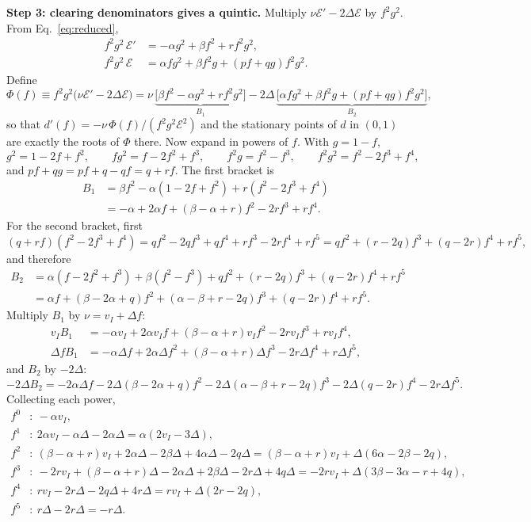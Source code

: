 \documentclass[11pt]{article}
\newcommand{\energy}{\mathcal E}
\begin{document}
\textbf{Step 3: clearing denominators gives a quintic.} Multiply $\nu\energy'-2\Delta\energy$ by $f^2g^2$. From Eq.~\eqref{eq:reduced},
\begin{align*}
 f^2g^2\,\energy'&=-\alpha g^2+\beta f^2+rf^2g^2,\\
 f^2g^2\,\energy&=\alpha fg^2+\beta f^2g+(pf+qg)f^2g^2 .
\end{align*}
Define
\begin{equation}
 \Phi(f)\equiv f^2g^2\bigl(\nu\energy'-2\Delta\energy\bigr)
 =\nu\,\underbrace{\bigl[\beta f^2-\alpha g^2+rf^2g^2\bigr]}_{B_1}
 -2\Delta\,\underbrace{\bigl[\alpha fg^2+\beta f^2g+(pf+qg)f^2g^2\bigr]}_{B_2},
 \label{eq:phi}
\end{equation}
so that $d'(f)=-\nu\,\Phi(f)/(f^2g^2\energy^2)$ and the stationary points of $d$ in $(0,1)$ are exactly the roots of $\Phi$ there. Now expand in powers of $f$. With $g=1-f$,
\[
 g^2=1-2f+f^2,\qquad fg^2=f-2f^2+f^3,\qquad f^2g=f^2-f^3,\qquad f^2g^2=f^2-2f^3+f^4,
\]
and $pf+qg=pf+q-qf=q+rf$. The first bracket is
\begin{align*}
 B_1&=\beta f^2-\alpha(1-2f+f^2)+r(f^2-2f^3+f^4)\\
    &=-\alpha+2\alpha f+(\beta-\alpha+r)f^2-2rf^3+rf^4 .
\end{align*}
For the second bracket, first
\[
 (q+rf)(f^2-2f^3+f^4)=qf^2-2qf^3+qf^4+rf^3-2rf^4+rf^5
 =qf^2+(r-2q)f^3+(q-2r)f^4+rf^5,
\]
and therefore
\begin{align*}
 B_2&=\alpha(f-2f^2+f^3)+\beta(f^2-f^3)+qf^2+(r-2q)f^3+(q-2r)f^4+rf^5\\
    &=\alpha f+(\beta-2\alpha+q)f^2+(\alpha-\beta+r-2q)f^3+(q-2r)f^4+rf^5 .
\end{align*}
Multiply $B_1$ by $\nu=v_I+\Delta f$:
\begin{align*}
 v_IB_1&=-\alpha v_I+2\alpha v_If+(\beta-\alpha+r)v_If^2-2rv_If^3+rv_If^4,\\
 \Delta fB_1&=-\alpha\Delta f+2\alpha\Delta f^2+(\beta-\alpha+r)\Delta f^3-2r\Delta f^4+r\Delta f^5,
\end{align*}
and $B_2$ by $-2\Delta$:
\[
 -2\Delta B_2=-2\alpha\Delta f-2\Delta(\beta-2\alpha+q)f^2-2\Delta(\alpha-\beta+r-2q)f^3-2\Delta(q-2r)f^4-2r\Delta f^5 .
\]
Collecting each power,
\begin{align*}
 f^0&:\ -\alpha v_I,\\
 f^1&:\ 2\alpha v_I-\alpha\Delta-2\alpha\Delta=\alpha(2v_I-3\Delta),\\
 f^2&:\ (\beta-\alpha+r)v_I+2\alpha\Delta-2\beta\Delta+4\alpha\Delta-2q\Delta=(\beta-\alpha+r)v_I+\Delta(6\alpha-2\beta-2q),\\
 f^3&:\ -2rv_I+(\beta-\alpha+r)\Delta-2\alpha\Delta+2\beta\Delta-2r\Delta+4q\Delta=-2rv_I+\Delta(3\beta-3\alpha-r+4q),\\
 f^4&:\ rv_I-2r\Delta-2q\Delta+4r\Delta=rv_I+\Delta(2r-2q),\\
 f^5&:\ r\Delta-2r\Delta=-r\Delta .
\end{align*}
\end{document}
